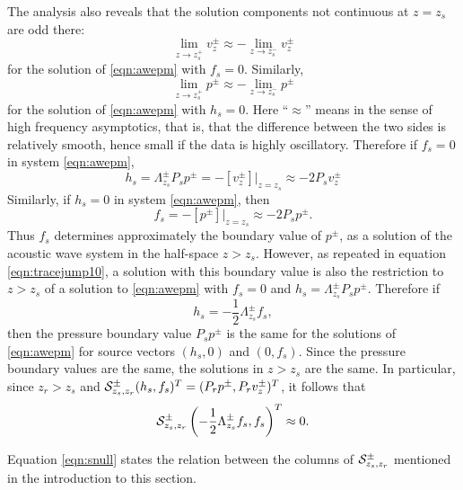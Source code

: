 The analysis also reveals that the solution components not continuous
at $z=z_s$ are odd there:
\begin{equation}
  \label{eqn:odd1}
  \lim_{z\rightarrow z_s^+} v^{\pm}_{z} \approx - \lim_{z\rightarrow z_s^-}
  v^{\pm}_{z}
\end{equation}
for the solution of \ref{eqn:awepm} with $f_s=0$.
Similarly, 
\begin{equation}
  \label{eqn:odd2}
  \lim_{z\rightarrow z_s^+} p^{\pm}\approx - \lim_{z\rightarrow z_s^-}
  p^{\pm}
\end{equation}
for the solution of \ref{eqn:awepm} with $h_s=0$. Here ``$\approx$''
means in the sense of high frequency asymptotics, that is, that the
difference between the two sides is relatively smooth, hence small if
the data is highly oscillatory. Therefore if $f_s=0$ in system \ref{eqn:awepm},
\begin{equation}
  h_s = \Lambda^{\pm}_{z_s}P_sp^{\pm} = -[v^{\pm}_{z}]|_{z=z_s} \approx -2
  P_sv^{\pm}_{z}
  \label{eqn:tracejump10}
\end{equation}
Similarly, if $h_s=0$ in system \ref{eqn:awepm}, then
\begin{equation}
  \label{eqn:tracejump20}
  f_s = -[p^{\pm}]|_{z=z_s} \approx -2 P_s p^{\pm}.
\end{equation}
Thus $f_s$ determines approximately the boundary value of $p^{\pm}$,
as a solution of the acoustic wave system in the half-space
$z>z_s$. However, as repeated in equation \ref{eqn:tracejump10}, a
solution with this boundary value is also the restriction to $z>z_s$
of a solution to \ref{eqn:awepm} with $f_s=0$ and $h_s=
\Lambda^{\pm}_{z_s}P_sp^{\pm}$. Therefore if
\begin{equation}
  \label{eqn:hfcondn}
  h_s =-\frac{1}{2}\Lambda^{\pm}_{z_s}f_s,
\end{equation}
then the pressure boundary value $P_sp^{\pm}$ is the
same for the solutions of \ref{eqn:awepm} for source vectors $(h_s,0)$
and $(0,f_s)$. Since the pressure boundary values are the same, the solutions
in $z>z_s$ are the same. In particular, since $z_r>z_s$ and ${\cal
  S}^{\pm}_{z_s,z_r}(h_s,f_s)^T = (P_rp^{\pm},P_rv^{\pm}_z)^T$, it follows
that
\begin{equation}
  \label{eqn:snull}
  {\cal S}^{\pm}_{z_s,z_r}\left(-\frac{1}{2}\Lambda^{\pm}_{z_s}f_s,f_s\right)^T \approx 0.
\end{equation}

Equation \ref{eqn:snull} states the relation between the columns of $
{\cal S}^{\pm}_{z_s,z_r}$ mentioned in the introduction to this
section.

